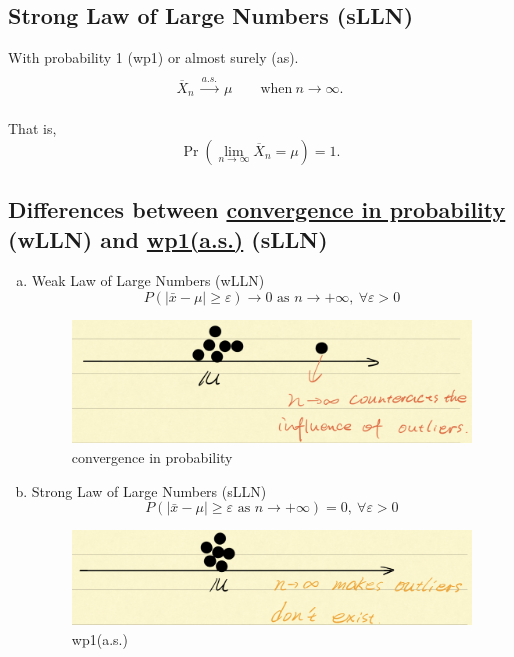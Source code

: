 \documentclass[11pt]{elegantbook}
\begin{document}
\subsection{Strong Law of Large Numbers (sLLN)}
\begin{theorem}
    \quad

    With probability 1 (wp1) or almost surely (as).
    $${\displaystyle {\begin{matrix}{}\\{\overline {X}}_{n}\ {\xrightarrow {a.s.}}\ \mu \qquad {\text{when}}\ n\to \infty .\\{}\end{matrix}}}$$

    That is,
    $$\Pr \!\left(\lim _{n\to \infty }{\overline {X}}_{n}=\mu \right)=1.$$
\end{theorem}

\subsection{Differences between \underline{convergence in probability} (wLLN) and \underline{wp1(a.s.)} (sLLN)}
\begin{enumerate}[a)]
    \item Weak Law of Large Numbers (wLLN)
    $$P(|\bar{x}-\mu|\geq\varepsilon)\rightarrow 0\text{ as }n \rightarrow	+\infty,\ \forall \varepsilon>0$$
    \begin{center}\begin{figure}[htbp]
        \centering
        \includegraphics[scale=0.3]{wLLN.png}
        \caption{convergence in probability}
        \label{}
    \end{figure}\end{center}
    \item Strong Law of Large Numbers (sLLN)
    $$P(|\bar{x}-\mu|\geq\varepsilon\text{ as }n \rightarrow+\infty)=0,\ \forall \varepsilon>0$$
    \begin{center}\begin{figure}[htbp]
        \centering
        \includegraphics[scale=0.3]{sLLN.png}
        \caption{wp1(a.s.)}
        \label{}
    \end{figure}\end{center}
\end{enumerate}
\end{document}
